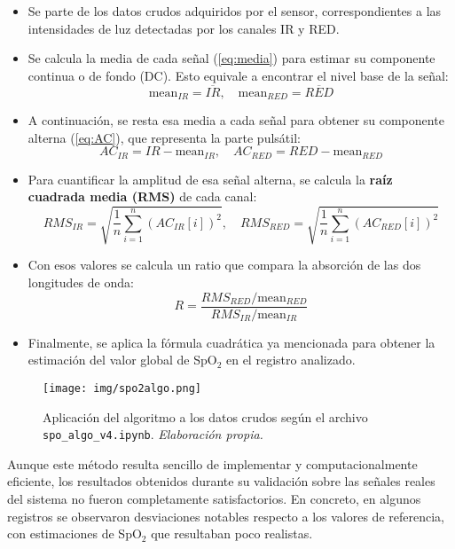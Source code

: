 \begin{itemize}
    \item Se parte de los datos crudos adquiridos por el sensor, correspondientes a las intensidades de luz detectadas por los canales IR y RED.
    \item Se calcula la media de cada señal (\ref{eq:media}) para estimar su componente continua o de fondo (DC). Esto equivale a encontrar el nivel base de la señal:
    \begin{equation}
    \text{mean}_{IR} = \overline{IR}, \quad \text{mean}_{RED} = \overline{RED}
    \label{eq:media}
    \end{equation}
    \item A continuación, se resta esa media a cada señal para obtener su componente alterna (\ref{eq:AC}), que representa la parte pulsátil:
    \begin{equation}
    AC_{IR} = IR - \text{mean}_{IR}, \quad AC_{RED} = RED - \text{mean}_{RED}
    \label{eq:AC}
    \end{equation}
    \item Para cuantificar la amplitud de esa señal alterna, se calcula la \textbf{raíz cuadrada media (RMS)} de cada canal:
    \begin{equation}
    RMS_{IR} = \sqrt{\frac{1}{n} \sum_{i=1}^{n} (AC_{IR}[i])^2}, \quad RMS_{RED} = \sqrt{\frac{1}{n} \sum_{i=1}^{n} (AC_{RED}[i])^2}
    \label{eq:RMS}
    \end{equation}
    \item Con esos valores se calcula un ratio que compara la absorción de las dos longitudes de onda:
    \begin{equation}
    R = \frac{RMS_{RED} / \text{mean}_{RED}}{RMS_{IR} / \text{mean}_{IR}}
    \end{equation}
    \item Finalmente, se aplica la fórmula cuadrática ya mencionada para obtener la estimación del valor global de SpO$_2$ en el registro analizado.
\end{itemize}

\begin{figure}[H]
    \centering
    \texttt{[image: img/spo2algo.png]}
    \caption{Aplicación del algoritmo a los datos crudos según el archivo \texttt{spo\_algo\_v4.ipynb}. \textit{Elaboración propia.}}
    \label{fig:spo2algo}
\end{figure}

Aunque este método resulta sencillo de implementar y computacionalmente eficiente, los resultados obtenidos durante su validación sobre las señales reales del sistema no fueron completamente satisfactorios. En concreto, en algunos registros se observaron desviaciones notables respecto a los valores de referencia, con estimaciones de SpO$_2$ que resultaban poco realistas.

